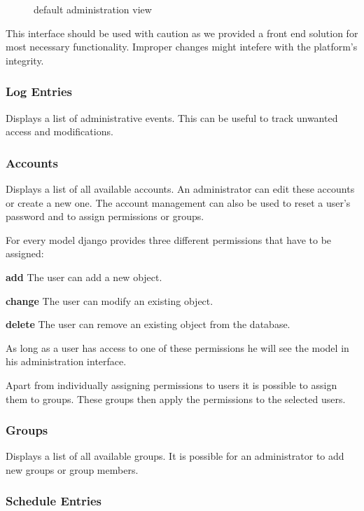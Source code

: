 \begin{figure}[htbp]
\centering
{}
\caption{default administration view}
\end{figure}

This interface should be used with caution as we provided a front end
solution for most necessary functionality. Improper changes might
intefere with the platform's integrity.

\subsubsection{Log Entries}\label{log-entries}

Displays a list of administrative events. This can be useful to track
unwanted access and modifications.

\subsubsection{Accounts}\label{accounts}

Displays a list of all available accounts. An administrator can edit
these accounts or create a new one. The account management can also be
used to reset a user's password and to assign permissions or groups.

For every model django provides three different permissions that have to
be assigned:

\textbf{add} The user can add a new object.

\textbf{change} The user can modify an existing object.

\textbf{delete} The user can remove an existing object from the
database.

As long as a user has access to one of these permissions he will see the
model in his administration interface.

Apart from individually assigning permissions to users it is possible to
assign them to groups. These groups then apply the permissions to the
selected users.

\subsubsection{Groups}\label{groups}

Displays a list of all available groups. It is possible for an
administrator to add new groups or group members.

\subsubsection{Schedule Entries}\label{schedule-entries}

